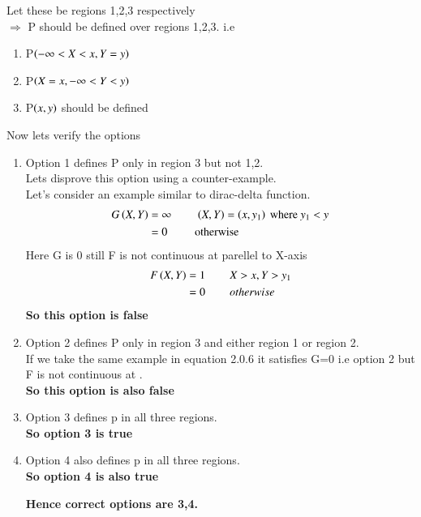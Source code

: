 \documentclass[journal,12pt,twocolumn]{IEEEtran}
\begin{document}
Let these be regions 1,2,3 respectively\\
$\Rightarrow$ P should be defined over regions 1,2,3. i.e
\begin{enumerate}
\item P$\left(-\infty<X<x,Y=y\right)$  
\item P$\left(X=x,-\infty<Y<y\right)$ 
\item P$\left(x,y\right) $ should be defined
\end{enumerate}
\vspace{2in}
Now lets verify the options
\begin{enumerate}
\item Option 1 defines P only in region 3 but not 1,2.\\
Lets disprove this option using a counter-example.\\
Let's consider an example similar to dirac-delta function.
\begin{align}
G\left(X,Y\right)&=\infty \hspace{0.3in} \left(X,Y\right)=\left(x,y_1\right)\text{ where }y_1<y \nonumber \\
&=0 \hspace{0.3in} \text{ otherwise}
\end{align}
Here G is 0 still F is not continuous at  parellel to X-axis
\begin{align}
F\left(X,Y\right)&=1 \hspace{0.3in} X>x,Y>y_1 \nonumber\\
&=0 \hspace{0.3in} otherwise
\end{align}
\textbf{So this option is false}
\item Option 2 defines P only in region 3 and either region 1 or region 2.\\
If we take the same example in equation 2.0.6 it satisfies G=0 i.e option 2 but F is not continuous at .\\
\textbf{So this option is also false}
\item Option 3 defines p in all three regions.\\
\textbf{So option 3 is true}
\item Option 4 also defines p in all three regions.\\
\textbf{So option 4 is also true}
\begin{center}
\textbf{Hence correct options are 3,4.}
\end{center}
\end{enumerate}
\end{document}
